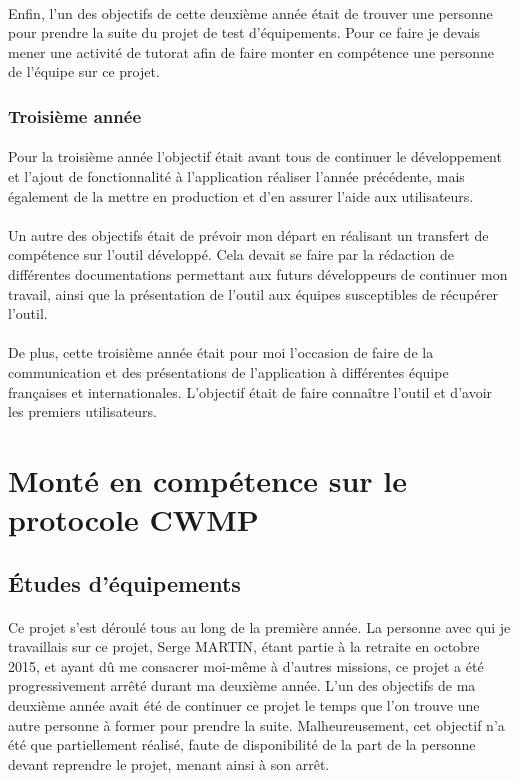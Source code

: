 \documentclass[12pt,a4paper]{report}
\begin{document}
\paragraph*{}Enfin, l'un des objectifs de cette deuxième année était de trouver une personne pour prendre la suite du projet de test d'équipements. Pour ce faire je devais mener une activité de tutorat afin de faire monter en compétence une personne de l'équipe sur ce projet.\\
\subsubsection{Troisième année}
\paragraph*{}Pour la troisième année l'objectif était avant tous de continuer le développement et l'ajout de fonctionnalité à l'application réaliser l'année précédente, mais également de la mettre en production et d'en assurer l'aide aux utilisateurs. 
\paragraph*{}Un autre des objectifs était de prévoir mon départ en réalisant un transfert de compétence sur l'outil développé. Cela devait se faire par la rédaction de différentes documentations permettant aux futurs développeurs de continuer mon travail, ainsi que la présentation de l'outil aux équipes susceptibles de récupérer l'outil. 
\paragraph*{}De plus, cette troisième année était pour moi l'occasion de faire de la communication et des présentations de l'application à différentes équipe françaises et internationales. L'objectif était de faire connaître l'outil et d'avoir les premiers utilisateurs.\\


\newpage
\section{Monté en compétence sur le protocole CWMP}
\subsection{Études d'équipements}
\paragraph*{}Ce projet s'est déroulé tous au long de la première année. La personne avec qui je travaillais sur ce projet, Serge MARTIN, étant partie à la retraite en octobre 2015, et ayant dû me consacrer moi-même à d'autres missions, ce projet a été progressivement arrêté durant ma deuxième année. L'un des objectifs de ma deuxième année avait été de continuer ce projet le temps que l'on trouve une autre personne à former pour prendre la suite. Malheureusement, cet objectif n'a été que partiellement réalisé, faute de disponibilité de la part de la personne devant reprendre le projet, menant ainsi à son arrêt.
\end{document}
